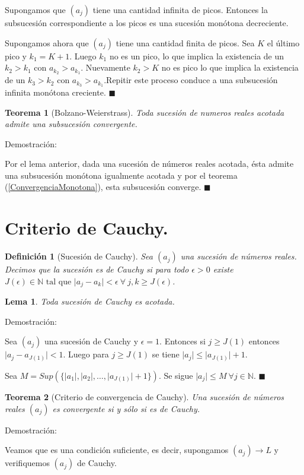 \documentclass[12pt]{book}
\newcommand\N{{\mathbb N}}
\providecommand{\abs}[1]{\lvert#1\rvert}
\newtheorem{teo}{Teorema}[section]
\newtheorem{defi}{Definición}[section]
\newtheorem{lema}{Lema}[section]
\begin{document}
Supongamos que $(a_j)$ tiene una cantidad infinita de picos. Entonces la subsucesión correspondiente a los picos es una sucesión monótona decreciente.

Supongamos ahora que $(a_j)$ tiene una cantidad finita de picos. Sea $K$ el último pico y $k_1=K+1$. Luego $k_1$ no es un pico, lo que implica la existencia de un $k_2>k_1 \mbox{ con } a_{k_2}>a_{k_1}$. Nuevamente $k_2>K$ no es pico lo que implica la existencia de un $k_3>k_2 \mbox{ con } a_{k_3}>a_{k_1}$.Repitir este proceso conduce a una subsucesión infinita monótona creciente. $\blacksquare$
\begin{teo}[Bolzano-Weierstrass]\rm\label{BolzanoWe}
Toda sucesión de numeros reales acotada admite una subsucesión convergente.
\end{teo}
Demostración:

Por el lema anterior, dada una sucesión de números reales acotada, ésta admite una subsucesión monótona igualmente acotada y por el teorema (\ref{ConvergenciaMonotona}), esta subsucesión converge. $\blacksquare$
\section{Criterio de Cauchy.}
\begin{defi}[Sucesión de Cauchy]\rm
Sea $(a_j)$ una sucesión de números reales. Decimos que la sucesión es de Cauchy si para todo $\epsilon>0$ existe $J(\epsilon) \in \N \mbox{ tal que } \abs{a_j-a_k}< \epsilon \ \forall \ j,k \ge J(\epsilon)$. 
\end{defi}
\begin{lema}\rm
Toda sucesión de Cauchy es acotada.
\end{lema}
Demostración:

Sea $(a_j)$ una sucesión de Cauchy y $\epsilon=1$. Entonces si $j \ge J(1)$ entonces $\abs{a_j-a_{J(1)}}<1$. Luego para $j \ge J(1)$ se tiene $\abs{a_j} \le \abs{a_{J(1)}}+1$.

Sea $M=Sup(\{ \abs{a_1},\abs{a_2}, \dots , \abs{a_{J(1)}}+1 \})$. Se sigue $\abs{a_j} \le M \ \forall{j \in \N}$. $\blacksquare$
\begin{teo}[Criterio de convergencia de Cauchy]\rm\label{CauchySucesiones}
Una sucesión de números reales $(a_j)$ es convergente si y sólo si es de Cauchy.
\end{teo}
Demostración:

Veamos que es una condición suficiente, es decir, supongamos $(a_j) \rightarrow L$ y verifiquemos $(a_j)$ de Cauchy.
\end{document}
